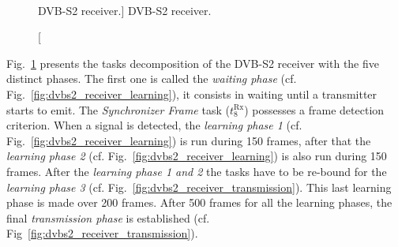 \begin{figure}[htp]
  \centering
  \\
  \caption
    [DVB-S2 receiver.]
    {DVB-S2 receiver.}
  \label{fig:dvbs2_receiver}
\end{figure}

Fig.~\ref{fig:dvbs2_receiver} presents the tasks decomposition of the DVB-S2
receiver with the five distinct phases. The first one is called the
\emph{waiting phase} (cf. Fig.~\ref{fig:dvbs2_receiver_learning}), it consists
in waiting until a transmitter starts to emit. The \emph{Synchronizer
Frame} task ($t^\text{Rx}_8$) possesses a frame detection criterion. When a
signal is detected, the \emph{learning phase 1} (cf.
Fig.~\ref{fig:dvbs2_receiver_learning}) is run during 150 frames, after that the
\emph{learning phase 2} (cf. Fig.~\ref{fig:dvbs2_receiver_learning}) is also run
during 150 frames. After the \emph{learning phase 1 and 2} the tasks have to be
re-bound for the \emph{learning phase 3}
(cf. Fig.~\ref{fig:dvbs2_receiver_transmission}). This last learning phase is
made over 200 frames. After 500 frames for all the learning phases, the final
\emph{transmission phase} is established (cf.
Fig~\ref{fig:dvbs2_receiver_transmission}).

